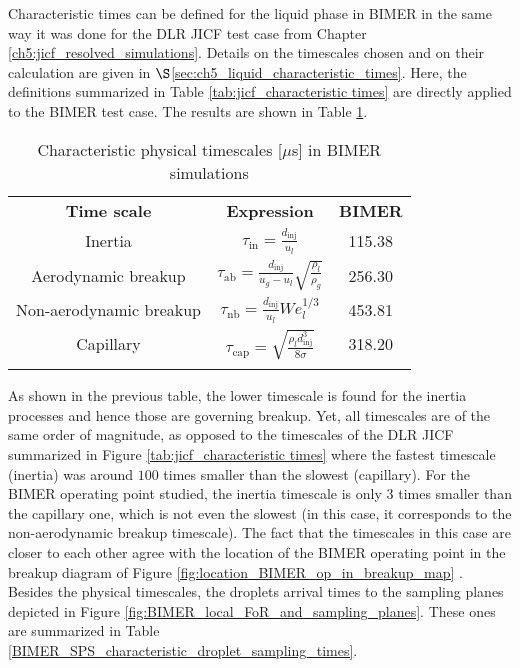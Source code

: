Characteristic times can be defined for the liquid phase in BIMER in the same way it was done for the DLR JICF test case from Chapter \ref{ch5:jicf_resolved_simulations}. Details on the timescales chosen and on their calculation are given in $\S$\ref{sec:ch5_liquid_characteristic_times}. Here, the definitions summarized in Table \ref{tab:jicf_characteristic times} are directly applied to the BIMER test case. The results are shown in Table \ref{tab:BIMER_SPS_characteristic times}. 

\begin{table}[!h]
\centering
\caption{Characteristic physical timescales [$\mu$s] in BIMER simulations}
\begin{tabular}{ccc}
\thickhline
\textbf{Time scale} & \textbf{Expression} & \textbf{BIMER} \\
\thickhline
Inertia & $\tau_\mathrm{in} = \frac{d_\mathrm{inj}}{u_l}$ & 115.38 \\
Aerodynamic breakup  &  $\tau_\mathrm{ab} =  \frac{d_\mathrm{inj}}{u_g - u_l} \sqrt{\frac{\rho_l}{\rho_g}} $ & 256.30 \\
Non-aerodynamic breakup  &  $\tau_\mathrm{nb} = \frac{d_\mathrm{inj}}{u_l} We_l^{1/3} $ &  453.81 \\
Capillary & $\tau_\mathrm{cap} = \sqrt{\frac{\rho_l d_\mathrm{inj}^3}{8 \sigma}}$ & 318.20 \\
\thickhline
\end{tabular}
\label{tab:BIMER_SPS_characteristic times}
\end{table} 

As shown in the previous table, the lower timescale is found for the inertia processes and hence those are governing breakup. Yet, all timescales are of the same order of magnitude, as opposed to the timescales of the DLR JICF summarized in Figure \ref{tab:jicf_characteristic times} where the fastest timescale (inertia) was around $100$ times smaller than the slowest (capillary). For the BIMER operating point studied, the inertia timescale is only $3$ times smaller than the capillary one, which is not even the slowest (in this case, it corresponds to the non-aerodynamic breakup timescale). The fact that the timescales in this case are closer to each other agree with the location of the BIMER operating point in the breakup diagram of Figure \ref{fig:location_BIMER_op_in_breakup_map} . Besides the physical timescales, the droplets arrival times to the sampling planes depicted in Figure \ref{fig:BIMER_local_FoR_and_sampling_planes}. These ones are summarized in Table \ref{BIMER_SPS_characteristic_droplet_sampling_times}. 

